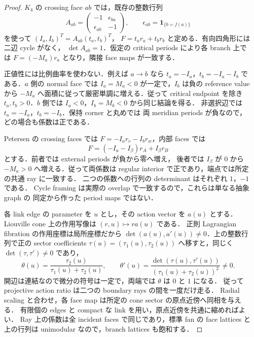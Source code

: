 \begin{proof}
$K_4$ の crossing face $ab$ では，既存の整数行列
\[
 A_{ab}=\begin{pmatrix}-1&\epsilon_{ba}\\
                         \epsilon_{ab}&-1\end{pmatrix},\qquad
 \epsilon_{ab}=\mathbf1_{\{b=f(a)\}}
\]
を使って $(I_a,I_b)^T=A_{ab}(t_a,t_b)^T$，
$F=t_ar_a+t_br_b$ と定める．有向四角形には二辺 cycle がなく，
$\det A_{ab}=1$．仮定の critical periods により各 branch 上では
$F=(-M_a)r_a$ となり，隣接 face maps が一致する．

正値性には比例曲率を使わない．例えば $a\to b$ なら
$t_a=-I_a$，$t_b=-I_a-I_b$ である．$a$ 側の normal face では
$I_a=M_a<0$ が一定で，$I_b$ は負の reference value から
$-M_a$ へ面積に従って厳密単調に増える．従って critical endpoint を除き
$t_a,t_b>0$．$b$ 側では $I_a<0$，$I_b=M_b<0$ から同じ結論を得る．
非選択辺では $t_a=-I_a$，$t_b=-I_b$．保持 corner と丸めでは
両 meridian periods が負なので，どの場合も係数は正である．

Petersen の crossing faces では
$F=-I_ar_v-I_br_w$，内部 faces では
\[
 F=(-I_a-I_\beta)r_A+I_\beta r_B
\]
とする．前者では external periods が負から零へ増え，
後者では $I_\beta$ が $0$ から $-M_a>0$ へ増える．従って両係数は
regular interior で正であり，端点では所定の共通 ray に一致する．
二つの係数への行列の determinant はそれぞれ $1$，$-1$ である．
Cycle framing は実際の overlap で一致するので，これらは単なる抽象 graph の
同定から作った period maps ではない．

各 link edge の parameter を $u$ とし，その action vector を $a(u)$ とする．
Liouville cone 上の作用写像は $(r,u)\mapsto ra(u)$ である．
正則 Lagrangian fibration の作用座標は局所座標だから
$\det(a(u),a'(u))\ne0$．上の整数行列で正の sector coefficients
$\tau(u)=(\tau_1(u),\tau_2(u))$ へ移すと，同じく
$\det(\tau,\tau')\ne0$ であり，
\[
 \theta(u)=\frac{\tau_2(u)}{\tau_1(u)+\tau_2(u)},\qquad
 \theta'(u)=\frac{\det(\tau(u),\tau'(u))}
                    {(\tau_1(u)+\tau_2(u))^2}\ne0.
\]
開辺は連結なので微分の符号は一定で，両端では $\theta$ は $0$ と $1$ になる．
従って projective action ratio は二つの boundary rays の間を一度だけ走る．
Radial scaling と合わせ，各 face map は所定の cone sector の原点近傍へ同相を与える．
有限個の edges と compact な link を用い，原点近傍を共通に縮めればよい．
Ray 上の係数は全 incident faces で同じであり，標準 fan の face lattices と
上の行列は unimodular なので，branch lattices も飽和する．


\end{proof}
